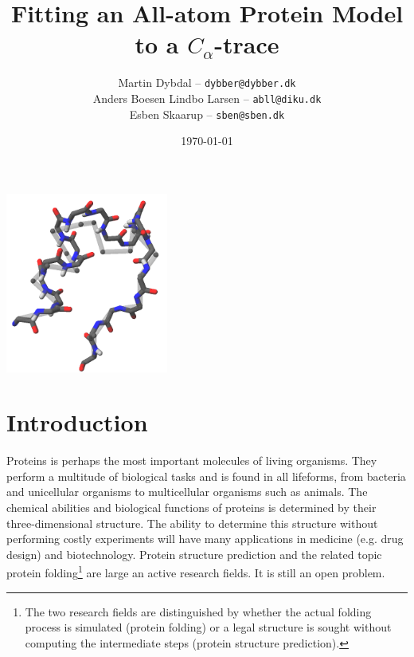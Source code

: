 \documentclass[10pt,a4paper,final,oneside,openany,article,twocolumn]{memoir}
\title{\vspace{-2cm}
  Fitting an All-atom Protein Model to a $C_\alpha$-trace\\
}
\author{
	Martin Dybdal -- \texttt{dybber@dybber.dk}\\
	Anders Boesen Lindbo Larsen -- \texttt{abll@diku.dk} \\
	Esben Skaarup -- \texttt{sben@sben.dk}
}
\date{\today}
\begin{document}
\tableofcontents*

\newpage


\hspace{0.5cm}\includegraphics[width=0.4\textwidth]{figures/forside.png}


\newpage
\chapter{Introduction}
Proteins is perhaps the most important molecules of living
organisms. They perform a multitude of biological tasks and is found
in all lifeforms, from bacteria and unicellular organisms to
multicellular organisms such as animals. The chemical abilities and
biological functions of proteins is determined by their
three-dimensional structure. The ability to determine this structure
without performing costly experiments will have many applications in
medicine (e.g. drug design) and biotechnology. Protein structure
prediction and the related topic protein folding\footnote{The two
  research fields are distinguished by whether the actual folding
  process is simulated (protein folding) or a legal structure is
  sought without computing the intermediate steps (protein structure
  prediction).} are large an active research fields. It is still an
open problem.
\end{document}
